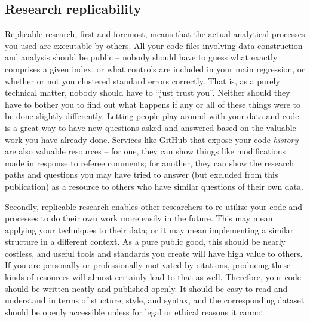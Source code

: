 \subsection{Research replicability}

Replicable research, first and foremost, means that the actual analytical processes you used
are executable by others. All your code files involving data construction and analysis
should be public -- nobody should have to guess what exactly comprises a given index,
or what controls are included in your main regression,
or whether or not you clustered standard errors correctly.
That is, as a purely technical matter, nobody should have to ``just trust you''.
Neither should they have to bother you to find out what happens
if any or all of these things were to be done slightly differently.\cite{simmons2011false,wicherts2016degrees}
Letting people play around with your data and code is a great way to have new questions asked and answered
based on the valuable work you have already done.
Services like GitHub that expose your code \textit{history}
are also valuable resources -- for one, they can show things like modifications
made in response to referee comments; for another, they can show
the research paths and questions you may have tried to answer (but excluded from this publication)
as a resource to others who have similar questions of their own data.

Secondly, replicable research enables other researchers to re-utilize your code and processes
to do their own work more easily in the future.
This may mean applying your techniques to their data;
or it may mean implementing a similar structure in a different context.
As a pure public good, this should be nearly costless,
and useful tools and standards you create will have high value to others.
If you are personally or professionally motivated by citations,
producing these kinds of resources will almost certainly lead to that as well.
Therefore, your code should be written neatly and published openly.
It should be easy to read and understand in terms of stucture, style, and syntax,
and the corresponding dataset should be openly accessible unless for legal or ethical reasons it cannot.
